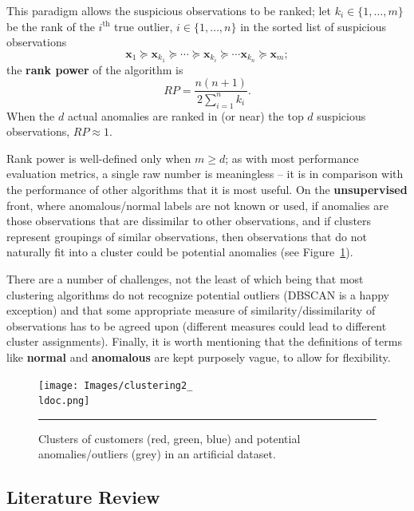 \par This paradigm allows the suspicious observations to be ranked; let $k_i\in\{1,\ldots,m\}$ be the rank of the $i^{\text{th}}$ true outlier, $i\in \{1,\ldots,n\}$ in the sorted list of suspicious observations $$\mathbf{x}_1\succeq \mathbf{x}_{k_1}\succeq \cdots\succeq\mathbf{x}_{k_i}\succeq \cdots \mathbf{x}_{k_n}\succeq \mathbf{x}_m;$$ the \textbf{rank power} of the algorithm is $$RP=\frac{n(n+1)}{2\sum_{i=1}^nk_i}.$$ When the $d$ actual anomalies are ranked in (or near) the top $d$ suspicious observations, $RP\approx 1$. \par Rank power is well-defined only when $m\geq d$; as with most performance evaluation metrics, a single raw number is meaningless -- it is in comparison with the performance of other algorithms that it is most useful.  \newl On the \textbf{unsupervised} front, where anomalous/normal labels are not known or used, if anomalies are those observations that are dissimilar to other observations, and if clusters represent groupings of similar observations, then observations that do not naturally fit into a cluster could be potential anomalies (see Figure~\ref{fig:clust2}). \par There are a number of challenges, not the least of which being that most clustering algorithms do not recognize potential outliers (DBSCAN is a happy exception) and that some appropriate measure of similarity/dissimilarity of observations has to be agreed upon (different measures could lead to different cluster assignments). \newl Finally, it is worth mentioning that the definitions of terms like \textbf{normal} and \textbf{anomalous} are kept purposely vague, to allow for flexibility. 
\begin{figure}[t]
\centering
\texttt{[image: Images/clustering2\_\\ldoc.png]}
\caption{\small Clusters of customers (red, green, blue) and potential anomalies/outliers (grey) in an artificial dataset.}\hrule\label{fig:clust2}
\end{figure}

\subsection{Literature Review}\newpage
